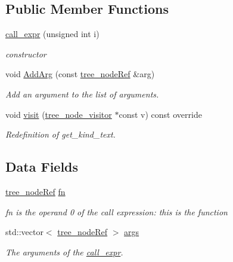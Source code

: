 \subsection*{Public Member Functions}
\begin{DoxyCompactItemize}
\item 
\hyperlink{structcall__expr_ad67d5c46b08fd64a5aa283294da7d846}{call\+\_\+expr} (unsigned int i)
\begin{DoxyCompactList}\small\item\em constructor \end{DoxyCompactList}\item 
void \hyperlink{structcall__expr_a88dc34da75c347528009ded3e1745242}{Add\+Arg} (const \hyperlink{tree__node_8hpp_a6ee377554d1c4871ad66a337eaa67fd5}{tree\+\_\+node\+Ref} \&arg)
\begin{DoxyCompactList}\small\item\em Add an argument to the list of arguments. \end{DoxyCompactList}\item 
void \hyperlink{structcall__expr_aeb0867ff82c5d47f5f86dd4e149f398f}{visit} (\hyperlink{classtree__node__visitor}{tree\+\_\+node\+\_\+visitor} $\ast$const v) const override
\begin{DoxyCompactList}\small\item\em Redefinition of get\+\_\+kind\+\_\+text. \end{DoxyCompactList}\end{DoxyCompactItemize}
\subsection*{Data Fields}
\begin{DoxyCompactItemize}
\item 
\hyperlink{tree__node_8hpp_a6ee377554d1c4871ad66a337eaa67fd5}{tree\+\_\+node\+Ref} \hyperlink{structcall__expr_a8c2caf3e2b9bb0cb22adc6e062b3f99f}{fn}
\begin{DoxyCompactList}\small\item\em fn is the operand 0 of the call expression\+: this is the function \end{DoxyCompactList}\item 
std\+::vector$<$ \hyperlink{tree__node_8hpp_a6ee377554d1c4871ad66a337eaa67fd5}{tree\+\_\+node\+Ref} $>$ \hyperlink{structcall__expr_a8f0d0ecd9b91bc4d9f69cf87131dac8a}{args}
\begin{DoxyCompactList}\small\item\em The arguments of the \hyperlink{structcall__expr}{call\+\_\+expr}. \end{DoxyCompactList}\end{DoxyCompactItemize}
